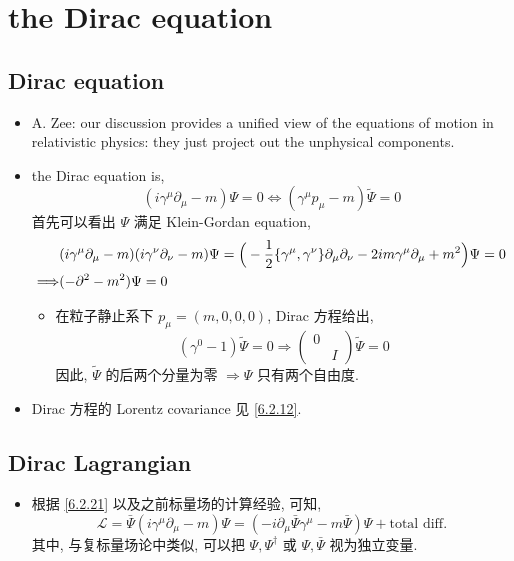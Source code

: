 \chapter{the Dirac equation}
\section{Dirac equation}
\begin{itemize}
	\item A. Zee: our discussion provides a unified view of the equations of motion in relativistic physics: they just project out the unphysical components.
	
	\item the Dirac equation is,
	\begin{equation}
		(i \gamma^\mu \partial_\mu - m) \Psi = 0 \iff (\gamma^\mu p_\mu - m) \tilde{\Psi} = 0
	\end{equation}
	首先可以看出 $\Psi$ 满足 Klein-Gordan equation,
	\begin{align}
		& (i \gamma^\mu \partial_\mu - m) (i \gamma^\nu \partial_\nu - m) \Psi = \Big( - \frac{1}{2} \{\gamma^\mu, \gamma^\nu\} \partial_\mu \partial_\nu - 2 i m \gamma^\mu \partial_\mu + m^2 \Big) \Psi = 0 \notag \\
		\Longrightarrow & (- \partial^2 - m^2) \Psi = 0
	\end{align}
	\begin{itemize}
		\item 在粒子静止系下 $p_\mu = (m, 0, 0, 0)$, Dirac 方程给出,
		\begin{equation}
			(\gamma^0 - 1) \tilde{\Psi} = 0 \Longrightarrow \begin{pmatrix}
				0 & \\
				& I
			\end{pmatrix} \tilde{\Psi} = 0
		\end{equation}
		因此, $\tilde{\Psi}$ 的后两个分量为零 $\Longrightarrow \Psi$ 只有两个自由度.
	\end{itemize}
	
	\item Dirac 方程的 Lorentz covariance 见 \eqref{6.2.12}.
\end{itemize}

\section{Dirac Lagrangian}
\begin{itemize}
	\item 根据 \eqref{6.2.21} 以及之前标量场的计算经验, 可知,
	\begin{equation} \label{7.2.1}
		\mathcal{L} = \bar{\Psi} (i \gamma^\mu \partial_\mu - m) \Psi = (- i \partial_\mu \bar{\Psi} \gamma^\mu - m \bar{\Psi}) \Psi + \text{total diff.}
	\end{equation}
	其中, 与复标量场论中类似, 可以把 $\Psi, \Psi^\dag$ 或 $\Psi, \bar{\Psi}$ 视为独立变量.
\end{itemize}

